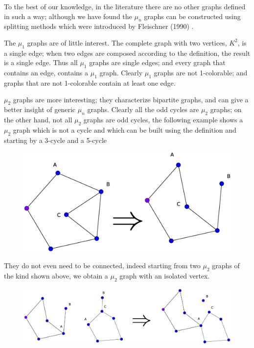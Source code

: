 \documentclass[a4paper,12pt,oneside]{book}
\begin{document}
To the best of our knowledge, in the literature there are no other graphs defined in such a way; although we have found the $\mu_n$ graphs can be constructed using splitting methods which were introduced by Fleischner (1990) \cite{split}.

The $\mu_1$ graphs are of little interest. The complete graph with two vertices, $K^2$, is a single edge; when two edges are composed according to the definition, the result is a single edge. Thus all $	\mu_1$ graphs are single edges; and every graph that contains  an edge, contains a $\mu_1$ graph. Clearly $\mu_1$ graphs are not 1-colorable; and graphs that are not 1-colorable contain at least one edge.

$\mu_2$ graphs are more interesting; they characterize bipartite graphs, and can give a better insight of generic $\mu_n$ graphs. Clearly all the odd cycles are $\mu_2$ graphs; on the other hand, not all $\mu_2$ graphs are odd cycles, the following example shows a $\mu_2$ graph which is not a cycle and which can be built using the definition and starting by a 3-cycle and a 5-cycle 
\begin{figure}[h]
\centering\includegraphics[scale=0.25]{mu2.eps}
\end{figure}

\noindent They do not even need to be connected, indeed starting from two $\mu_2$ graphs of the kind shown above, we obtain a $\mu_2$ graph with an isolated vertex.

\begin{figure}[h]
\centering\includegraphics[scale=0.25]{mu2-con1.eps}
\end{figure}
\end{document}
